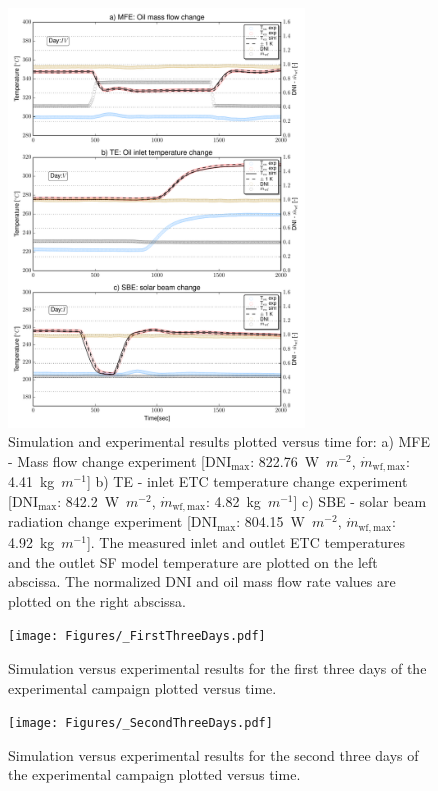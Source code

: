 \documentclass[final,3p,times,review]{elsarticle}
\begin{document}
%
\begin{figure}[h!]
\centering
\includegraphics[width=0.7\textwidth]{Figures/_MassFlowChange_Unc.pdf}
\caption{Simulation and experimental results plotted versus time for: a) MFE - Mass flow change experiment [DNI$_\mathrm{max}$: 822.76~W~$m^{-2}$, $\dot{m}_\mathrm{wf,max}$: 4.41~kg~$m^{-1}$] b) TE - inlet ETC temperature change experiment [DNI$_\mathrm{max}$: 842.2~W~$m^{-2}$, $\dot{m}_\mathrm{wf,max}$: 4.82~kg~$m^{-1}$] c) SBE - solar beam radiation change experiment  [DNI$_\mathrm{max}$: 804.15~W~$m^{-2}$, $\dot{m}_\mathrm{wf,max}$: 4.92~kg~$m^{-1}$]. The measured inlet and outlet ETC temperatures and the outlet SF model temperature are plotted on the left abscissa. The normalized DNI and oil mass flow rate values are plotted on the right abscissa.}
\label{fig:SF_ModRes_Zoomed}
\end{figure}
%
%
\begin{figure}[h!]
\centering
\texttt{[image: Figures/\_FirstThreeDays.pdf]}
\caption{Simulation versus experimental results for the first three days of the experimental campaign plotted versus time. }
\label{fig:SF_ModRes_First3Days}
\end{figure}
%
%
\begin{figure}[h!]
	\centering
	\texttt{[image: Figures/\_SecondThreeDays.pdf]}
	\caption{Simulation versus experimental results for  the second three days of the experimental campaign plotted versus time. }
	\label{fig:SF_ModRes_Second3Days}
\end{figure}
%
\clearpage
%
\end{document}
